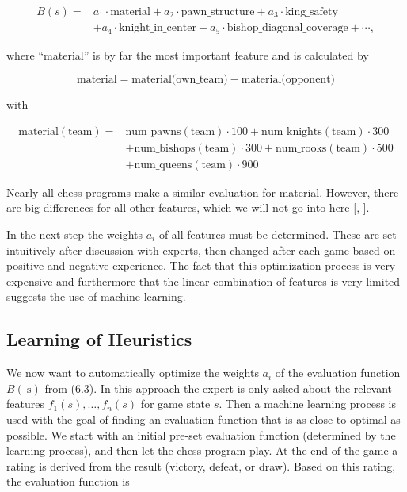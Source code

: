 \documentclass[10pt]{book}
\begin{document}
\begin{align}
B(s)= & a_{1} \cdot \text{material}+a_{2} \cdot \text{pawn\_structure}+a_{3} \cdot \text{king\_safety} \\
& +a_{4} \cdot \text{knight\_in\_center}+a_{5} \cdot \text{bishop\_diagonal\_coverage}+\cdots, \tag{6.3}
\end{align}

where ``material'' is by far the most important feature and is calculated by

$$
\text{material}=\text{material(own\_team)}-\text{material(opponent)}
$$

with

$$
\begin{aligned}
\text{material}(\text{team})= & \text{num\_pawns}(\text{team}) \cdot 100+\text{num\_knights}(\text{team}) \cdot 300 \\
& + \text{num\_bishops}(\text{team}) \cdot 300+\text{num\_rooks}(\text{team}) \cdot 500 \\
& + \text{num\_queens}(\text{team}) \cdot 900
\end{aligned}
$$

Nearly all chess programs make a similar evaluation for material. However, there are big differences for all other features, which we will not go into here [\cite{frayn2005chess}, \cite{laramee2000chess}].

In the next step the weights $a_{i}$ of all features must be determined. These are set intuitively after discussion with experts, then changed after each game based on positive and negative experience. The fact that this optimization process is very expensive and furthermore that the linear combination of features is very limited suggests the use of machine learning.

\subsection{Learning of Heuristics}
We now want to automatically optimize the weights $a_{i}$ of the evaluation function $B(\mathrm{~s})$ from (6.3). In this approach the expert is only asked about the relevant features $f_{1}(s), \ldots, f_{n}(s)$ for game state $s$. Then a machine learning process is used with the goal of finding an evaluation function that is as close to optimal as possible. We start with an initial pre-set evaluation function (determined by the learning process), and then let the chess program play. At the end of the game a rating is derived from the result (victory, defeat, or draw). Based on this rating, the evaluation function is
\end{document}
